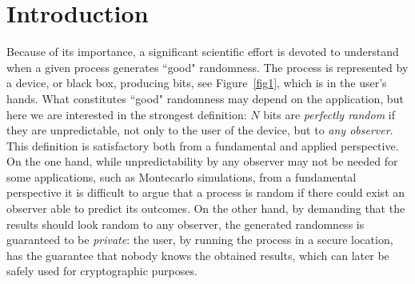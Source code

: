 \documentclass[11pt,a4paper]{article}
\begin{document}

\section{Introduction}



Because of its importance, a significant scientific effort is
devoted to understand when a given %
process generates ``good"
randomness. The process is represented by a device, or
black box, producing bits, see Figure~\ref{fig1}, which is in the
user's hands.
What constitutes ``good" randomness may depend on the
application, but here we are interested in the strongest
definition: $N$ bits are \emph{perfectly random} if they are unpredictable, not only to the user of the device, but to \emph{any observer}.
This definition is satisfactory both from a fundamental
and applied perspective. On the one hand, while unpredictability
by any observer may not be needed for some applications,
such as Montecarlo simulations, from a
fundamental perspective it is difficult to argue that a process is
random if there could exist an observer able to predict its
outcomes. On the other hand, by demanding that the results should
look random to any observer, the generated randomness is
guaranteed to be \emph{private}: the user, by running the process
in a secure location, has the guarantee that nobody knows the
obtained results, which can later be safely used for cryptographic
purposes.
\end{document}
